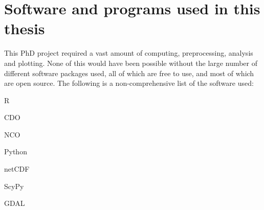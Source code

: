 \chapter{Software and programs used in this thesis}  \label{appendix_software}
This PhD project required a vast amount of computing, preprocessing, analysis and plotting.
None of this would have been possible without the large number of different software packages used, all of which are free to use, and most of which are open source.
The following is a non-comprehensive list of the software used:
\begin{multicols}{2}
    \begin{description}
        \item[R] \citet{R}
        \item[CDO] \citet{CDO}
        \item[NCO] \citet{Zender2008}
        \item[Python] \citet{python}
        \item[netCDF] \citet{netcdf}
        \item[ScyPy] \citet{Jones2007}
        \item[GDAL] \citet{GDAL}
    \end{description}
\end{multicols}

